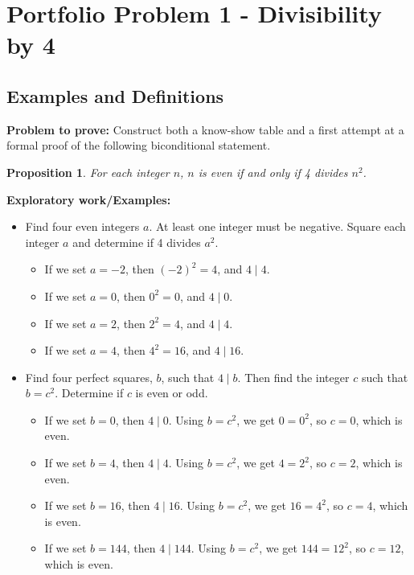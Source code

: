 \documentclass[12pt]{article}
\newtheorem*{prop}{Proposition}
\theoremstyle{definition}
\begin{document}
\section{Portfolio Problem 1 - Divisibility by 4}

\subsection{Examples and Definitions}

\textbf{Problem to prove:} Construct both a know-show table and a first attempt at a formal proof of the following biconditional statement.

\begin{prop}
    For each integer \( n \), \( n \) is even if and only if 4 divides \( n^2 \).
\end{prop}


\textbf{Exploratory work/Examples:}
\begin{itemize}
    \item Find four even integers \( a \). At least one integer must be negative. Square each integer \( a \) and determine if 4 divides \( a^2 \).
    \begin{itemize}
        \item If we set \( a = -2 \), then \( (-2)^2 = 4 \), and \( 4 \mid 4 \).
        \item If we set \( a = 0 \), then \( 0^2 = 0 \), and \( 4 \mid 0 \).
        \item If we set \( a = 2 \), then \( 2^2 = 4 \), and \( 4 \mid 4 \).
        \item If we set \( a = 4 \), then \( 4^2 = 16 \), and \( 4 \mid 16 \).
    \end{itemize}
    
    \item Find four perfect squares, \( b \), such that \( 4 \mid b \). Then find the integer \( c \) such that \( b = c^2 \). Determine if \( c \) is even or odd.
    \begin{itemize}
        \item If we set \( b = 0 \), then \( 4 \mid 0 \). Using \( b = c^2 \), we get \( 0 = 0^2 \), so \( c = 0 \), which is even.
        \item If we set \( b = 4 \), then \( 4 \mid 4 \). Using \( b = c^2 \), we get \( 4 = 2^2 \), so \( c = 2 \), which is even.
        \item If we set \( b = 16 \), then \( 4 \mid 16 \). Using \( b = c^2 \), we get \( 16 = 4^2 \), so \( c = 4 \), which is even.
        \item If we set \( b = 144 \), then \( 4 \mid 144 \). Using \( b = c^2 \), we get \( 144 = 12^2 \), so \( c = 12 \), which is even.
    \end{itemize}
\end{itemize}
\end{document}
